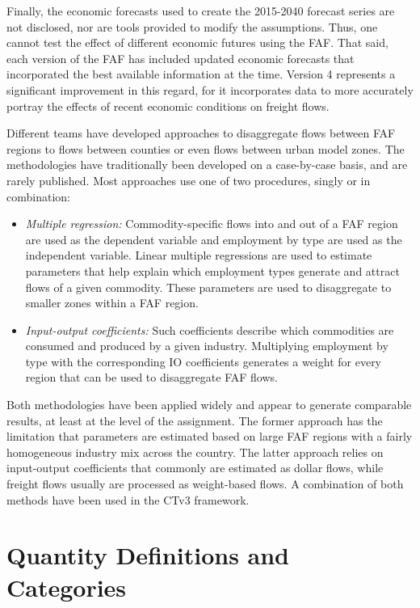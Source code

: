Finally, the economic forecasts used to create the 2015-2040 forecast series are not disclosed, nor are tools provided to modify the assumptions. Thus, one cannot test the effect of different economic futures using the FAF. That said, each version of the FAF has included updated economic forecasts that incorporated the best available information at the time. Version 4 represents a significant improvement in this regard, for it incorporates data to more accurately portray the effects of recent economic conditions on freight flows.

Different teams have developed approaches to disaggregate flows between FAF regions to flows between counties or even flows between urban model zones. The methodologies have traditionally been developed on a case-by-case basis, and are rarely published. Most approaches use one of two procedures, singly or in combination:
\begin{itemize}
\item \textit{Multiple regression:} Commodity-specific flows into and out of a FAF region are used as the dependent variable and employment by type are used as the independent variable. Linear multiple regressions are used to estimate parameters that help explain which employment types generate and attract flows of a given commodity. These parameters are used to disaggregate to smaller zones within a FAF region. 
\item \textit{Input-output coefficients:} Such coefficients describe which commodities are consumed and produced by a given industry. Multiplying employment by type with the corresponding IO coefficients generates a weight for every region that can be used to disaggregate FAF flows.
\end{itemize}

\noindent Both methodologies have been applied widely and appear to generate comparable results, at least at the level of the assignment. The former approach has the limitation that parameters are estimated based on large FAF regions with a fairly homogeneous industry mix across the country. The latter approach relies on input-output coefficients that commonly are estimated as dollar flows, while freight flows usually are processed as weight-based flows. A combination of both methods have been used in the CTv3 framework.

\section{Quantity Definitions and Categories}

